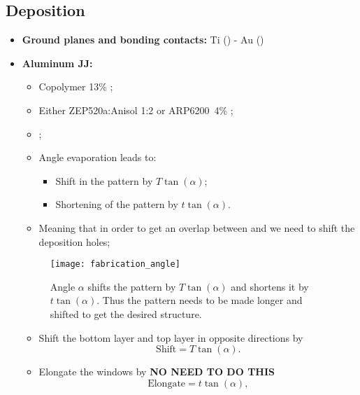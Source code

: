 \newpage\subsection{Deposition}
\label{sec:deposition}


\begin{itemize}
\item \textbf{Ground planes and  bonding contacts:} Ti ()
  - Au ()
\item \textbf{Aluminum JJ:}
  \begin{itemize}
  \item Copolymer 13\% \hfill {};
  \item  Either ZEP520a:Anisol  1:2  or ARP6200\  4\%  \hfill {};
  \item {};
  \item Angle evaporation leads to:
    \begin{itemize}
    \item Shift in the pattern by $ T\tan(\alpha) $;
    \item Shortening of the pattern by $ t\tan(\alpha) $.
    \end{itemize}
  \item Meaning that  in order to get an overlap  between  and
     we need to shift the deposition holes;
  \end{itemize}
  \begin{figure}[h]
    \centering \texttt{[image: fabrication\_angle]}
    \caption{\small    Angle   $\alpha$    shifts   the    pattern   by
      $ T\tan(\alpha) $  and shortens it by $  t\tan(\alpha).$ Thus the
      pattern needs  to be made longer  and shifted to get  the desired
      structure. \label{fig:fabrication_angle}}
  \end{figure}
  \begin{itemize}
  \item Shift the bottom layer and top layer in opposite directions by
    \begin{equation}
      \label{eq:jj_overlap}
      \text{Shift} = T\tan(\alpha).
    \end{equation}
  \item  Elongate  the windows    by
    \hfill \textbf{NO NEED TO DO THIS}
    \begin{equation}
      \label{eq:jj_elongate}
      \text{Elongate} = t\tan(\alpha),
    \end{equation}
  \end{itemize}
\end{itemize}
